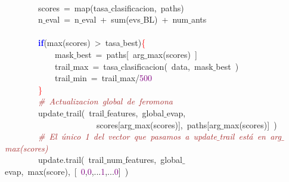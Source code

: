 \mbox{} \\
\mbox{}\ \ \ \ \ \ \ \ scores\ \textcolor{BrickRed}{=}\ map\textcolor{BrickRed}{(}tasa$\_$clasificacion\textcolor{BrickRed}{,}\ paths\textcolor{BrickRed}{)} \\
\mbox{}\ \ \ \ \ \ \ \ n$\_$eval\ \textcolor{BrickRed}{=}\ n$\_$eval\ \textcolor{BrickRed}{+}\ sum\textcolor{BrickRed}{(}evs$\_$BL\textcolor{BrickRed}{)}\ \textcolor{BrickRed}{+}\ num$\_$ants \\
\mbox{} \\
\mbox{}\ \ \ \ \ \ \ \ \textbf{\textcolor{Blue}{if}}\textcolor{BrickRed}{(}max\textcolor{BrickRed}{(}scores\textcolor{BrickRed}{)}\ \textcolor{BrickRed}{\textgreater{}}\ tasa$\_$best\textcolor{BrickRed}{)}\textcolor{Red}{\{} \\
\mbox{}\ \ \ \ \ \ \ \ \ \ \ \ mask$\_$best\ \textcolor{BrickRed}{=}\ paths\textcolor{BrickRed}{[}\ arg$\_$max\textcolor{BrickRed}{(}scores\textcolor{BrickRed}{)}\ \textcolor{BrickRed}{]} \\
\mbox{}\ \ \ \ \ \ \ \ \ \ \ \ trail$\_$max\ \textcolor{BrickRed}{=}\ tasa$\_$clasificacion\textcolor{BrickRed}{(}\ data\textcolor{BrickRed}{,}\ mask$\_$best\ \textcolor{BrickRed}{)} \\
\mbox{}\ \ \ \ \ \ \ \ \ \ \ \ trail$\_$min\ \textcolor{BrickRed}{=}\ trail$\_$max\textcolor{BrickRed}{/}\textcolor{Purple}{500} \\
\mbox{}\ \ \ \ \ \ \ \ \textcolor{Red}{\}} \\
\mbox{}\ \ \ \ \ \ \ \ \textit{\textcolor{Brown}{\#\ Actualizacion\ global\ de\ feromona}} \\
\mbox{}\ \ \ \ \ \ \ \ update$\_$trail\textcolor{BrickRed}{(}\ trail$\_$features\textcolor{BrickRed}{,}\ global$\_$evap\textcolor{BrickRed}{,} \\
\mbox{}\ \ \ \ \ \ \ \ \ \ \ \ \ \ \ \ \ \ \ \ \ \ scores\textcolor{BrickRed}{[}arg$\_$max\textcolor{BrickRed}{(}scores\textcolor{BrickRed}{)],}\ paths\textcolor{BrickRed}{[}arg$\_$max\textcolor{BrickRed}{(}scores\textcolor{BrickRed}{)]}\ \textcolor{BrickRed}{)} \\
\mbox{}\ \ \ \ \ \ \ \ \textit{\textcolor{Brown}{\#\ El\ único\ 1\ del\ vector\ que\ pasamos\ a\ update$\_$trail\ está\ en\ arg$\_$max(scores)}} \\
\mbox{}\ \ \ \ \ \ \ \ update\textcolor{BrickRed}{.}trail\textcolor{BrickRed}{(}\ trail$\_$num$\_$features\textcolor{BrickRed}{,}\ global$\_$evap\textcolor{BrickRed}{,}\ max\textcolor{BrickRed}{(}score\textcolor{BrickRed}{),}\ \textcolor{BrickRed}{[}\ \textcolor{Purple}{0}\textcolor{BrickRed}{,}\textcolor{Purple}{0}\textcolor{BrickRed}{,...}\textcolor{Purple}{1}\textcolor{BrickRed}{,...}\textcolor{Purple}{0}\textcolor{BrickRed}{]}\ \textcolor{BrickRed}{)} \\
